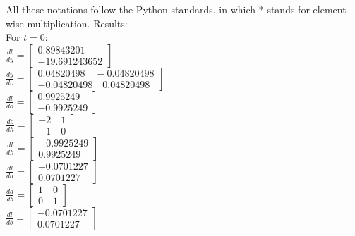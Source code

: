 \documentclass[12pt]{article}
\begin{document}
All these notations follow the Python standards, in which $*$ stands
    for element\--wise multiplication.
Results:\\
For $t=0$:\\
$\frac{dl}{dy}=\begin{bmatrix} 0.89843201 \\ -19.691243652 \end{bmatrix}$\\
$\frac{dy}{do}=\begin{bmatrix} 0.04820498 \quad -0.04820498\\
                              -0.04820498 \quad  0.04820498 \end{bmatrix}$\\
$\frac{dl}{do}=\begin{bmatrix} 0.9925249 \\ -0.9925249\end{bmatrix}$\\
$\frac{do}{dh}=\begin{bmatrix} -2 \quad 1\\
                               -1 \quad 0 \end{bmatrix}$\\
$\frac{dl}{dh}=\begin{bmatrix} -0.9925249 \\ 0.9925249\end{bmatrix}$\\
$\frac{dl}{da}=\begin{bmatrix} -0.0701227 \\ 0.0701227\end{bmatrix}$\\
$\frac{da}{db}=\begin{bmatrix} 1 \quad 0\\
                               0 \quad 1 \end{bmatrix}$\\
$\frac{dl}{db}=\begin{bmatrix} -0.0701227 \\ 0.0701227\end{bmatrix}$\\
\end{document}
